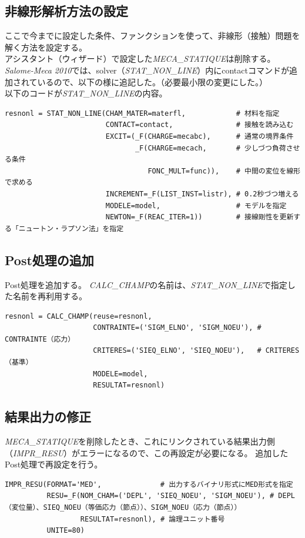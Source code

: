 \documentclass[a4j,11pt,twoside,openany,dvipdfmx]{jsarticle}
\begin{document}
\subsection{非線形解析方法の設定}
ここで今までに設定した条件、ファンクションを使って、非線形（接触）問題を解く方法を設定する。\\
アシスタント（ウィザード）で設定した\textit{MECA\_STATIQUE}は削除する。\\
\textit{Salome-Meca 2010}では、solver（\textit{STAT\_NON\_LINE}）内にcontactコマンドが追加されているので、以下の様に追記した。（必要最小限の変更にした。）\\
以下のコードが\textit{STAT\_NON\_LINE}の内容。
\begin{lstlisting}[caption=非線形解析方法,label=STAT_NON_LINE]
resnonl = STAT_NON_LINE(CHAM_MATER=materfl,            # 材料を指定
                        CONTACT=contact,               # 接触を読み込む
                        EXCIT=(_F(CHARGE=mecabc),      # 通常の境界条件
                               _F(CHARGE=mecach,       # 少しづつ負荷させる条件
                                  FONC_MULT=func)),    # 中間の変位を線形で求める
                        INCREMENT=_F(LIST_INST=listr), # 0.2秒づつ増える
                        MODELE=model,                  # モデルを指定
                        NEWTON=_F(REAC_ITER=1))        # 接線剛性を更新する「ニュートン・ラプソン法」を指定
\end{lstlisting}
\subsection{Post処理の追加}
Post処理を追加する。
\textit{CALC\_CHAMP}の名前は、\textit{STAT\_NON\_LINE}で指定した名前を再利用する。
\begin{lstlisting}[caption=Post処理,label=CALC_CHAMP]
resnonl = CALC_CHAMP(reuse=resnonl,
                     CONTRAINTE=('SIGM_ELNO', 'SIGM_NOEU'), # CONTRAINTE（応力）
                     CRITERES=('SIEQ_ELNO', 'SIEQ_NOEU'),   # CRITERES（基準）
                     MODELE=model,
                     RESULTAT=resnonl)
\end{lstlisting}
\subsection{結果出力の修正}
\textit{MECA\_STATIQUE}を削除したとき、これにリンクされている結果出力側（\textit{IMPR\_RESU}）がエラーになるので、この再設定が必要になる。
追加したPost処理で再設定を行う。
\begin{lstlisting}[caption=結果出力,label=IMPR_RESU]
IMPR_RESU(FORMAT='MED',              # 出力するバイナリ形式にMED形式を指定
          RESU=_F(NOM_CHAM=('DEPL', 'SIEQ_NOEU', 'SIGM_NOEU'), # DEPL（変位量）、SIEQ_NOEU（等価応力（節点））、SIGM_NOEU（応力（節点））
                  RESULTAT=resnonl), # 論理ユニット番号
          UNITE=80)
\end{lstlisting}
\end{document}
